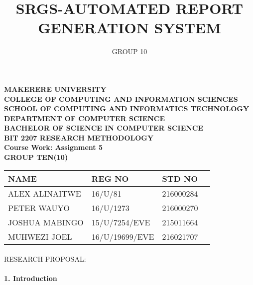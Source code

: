 \documentclass[10pt,a4paper]{report}
\author{GROUP 10}
\title{SRGS-AUTOMATED REPORT GENERATION SYSTEM}
\begin{document}
\begin{Huge}
\begin{center}
\begin{normalsize}
\textbf{MAKERERE UNIVERSITY }\\
\textbf{COLLEGE OF COMPUTING AND INFORMATION SCIENCES} \\
\textbf{SCHOOL OF COMPUTING AND INFORMATICS TECHNOLOGY} \\
\textbf{DEPARTMENT OF COMPUTER SCIENCE} \\
\textbf{BACHELOR OF SCIENCE IN COMPUTER SCIENCE} \\
\textbf{BIT 2207 RESEARCH METHODOLOGY} \\
\textbf{Course Work: Assignment 5}\\
\textbf{GROUP TEN(10)}
\end{normalsize}
\end{center}
\end{Huge}

\begin{center}
\begin{tabular}{|l|l|l|c|}
\hline NAME  & REG NO & STD NO \\\hline
ALEX ALINAITWE & 16/U/81 & 216000284 \\\hline
PETER WAUYO & 16/U/1273 & 216000270 \\\hline
JOSHUA MABINGO & 15/U/7254/EVE & 215011664 \\\hline
MUHWEZI JOEL & 16/U/19699/EVE & 216021707 \\\hline
\end{tabular}

\paragraph{}
RESEARCH PROPOSAL:
\end{center}

\newpage
\maketitle


\paragraph{1.  Introduction}
\end{document}

